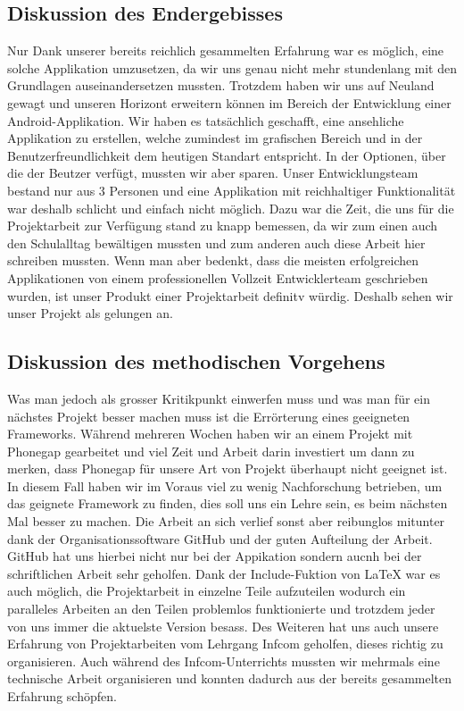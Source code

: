 \subsection{Diskussion des Endergebisses}
Nur Dank unserer bereits reichlich gesammelten Erfahrung war es möglich, eine solche Applikation umzusetzen, da wir uns genau nicht mehr stundenlang mit den Grundlagen auseinandersetzen mussten. Trotzdem haben wir uns auf Neuland gewagt und unseren Horizont erweitern können im Bereich der Entwicklung einer Android-Applikation. Wir haben es tatsächlich geschafft, eine ansehliche Applikation zu erstellen, welche zumindest im grafischen Bereich und in der Benutzerfreundlichkeit dem heutigen Standart entspricht. In der Optionen, über die der Beutzer verfügt, mussten wir aber sparen. Unser Entwicklungsteam bestand nur aus 3 Personen und eine Applikation mit reichhaltiger Funktionalität war deshalb schlicht und einfach nicht möglich. Dazu war die Zeit, die uns für die Projektarbeit zur Verfügung stand zu knapp bemessen, da wir zum einen auch den Schulalltag bewältigen mussten und zum anderen auch diese Arbeit hier schreiben mussten. Wenn man aber bedenkt, dass die meisten erfolgreichen Applikationen von einem professionellen Vollzeit Entwicklerteam geschrieben wurden, ist unser Produkt einer Projektarbeit definitv würdig. Deshalb sehen wir unser Projekt als gelungen an. 
\subsection{Diskussion des methodischen Vorgehens}
Was man jedoch als grosser Kritikpunkt einwerfen muss und was man für ein nächstes Projekt besser machen muss ist die Errörterung eines geeigneten Frameworks. Während mehreren Wochen haben wir an einem Projekt mit Phonegap gearbeitet und viel Zeit und Arbeit darin investiert um dann zu merken, dass Phonegap für unsere Art von Projekt überhaupt nicht geeignet ist. In diesem Fall haben wir im Voraus viel zu wenig Nachforschung betrieben, um das geignete Framework zu finden, dies soll uns ein Lehre sein, es beim nächsten Mal besser zu machen. Die Arbeit an sich verlief sonst aber reibunglos mitunter dank der Organisationssoftware GitHub und der guten Aufteilung der Arbeit. GitHub hat uns hierbei nicht nur bei der Appikation sondern aucnh bei der schriftlichen Arbeit sehr geholfen. Dank der Include-Fuktion von LaTeX war es auch möglich, die Projektarbeit in einzelne Teile aufzuteilen wodurch ein paralleles Arbeiten an den Teilen problemlos funktionierte und trotzdem jeder von uns immer die aktuelste Version besass. Des Weiteren hat uns auch unsere Erfahrung von Projektarbeiten vom Lehrgang Infcom geholfen, dieses richtig zu organisieren. Auch während des Infcom-Unterrichts mussten wir mehrmals eine technische Arbeit organisieren und konnten dadurch aus der bereits gesammelten Erfahrung schöpfen.